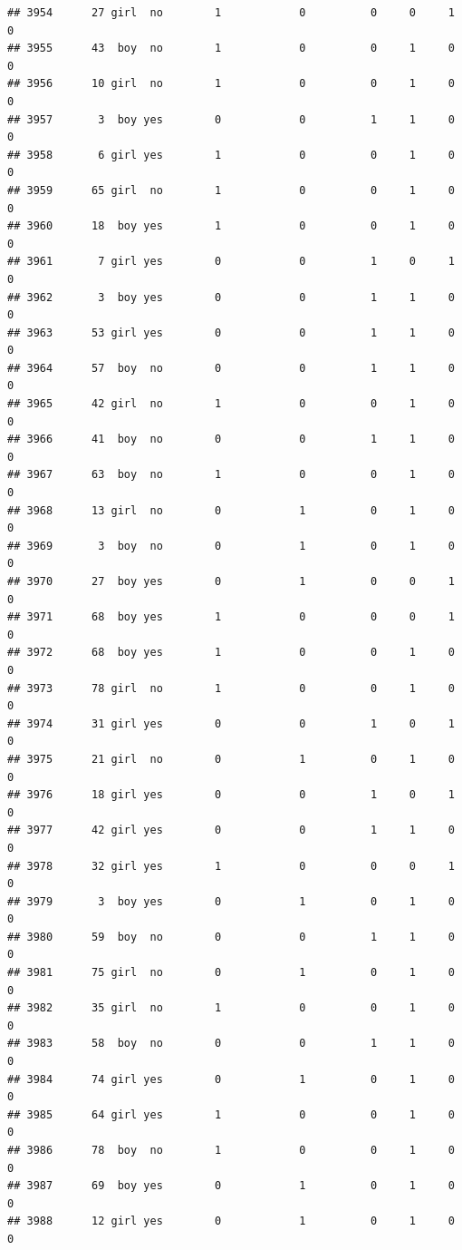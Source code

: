 \documentclass[man]{apa6}
\begin{document}
\begin{verbatim}
## 3954      27 girl  no        1            0          0     0     1     0
## 3955      43  boy  no        1            0          0     1     0     0
## 3956      10 girl  no        1            0          0     1     0     0
## 3957       3  boy yes        0            0          1     1     0     0
## 3958       6 girl yes        1            0          0     1     0     0
## 3959      65 girl  no        1            0          0     1     0     0
## 3960      18  boy yes        1            0          0     1     0     0
## 3961       7 girl yes        0            0          1     0     1     0
## 3962       3  boy yes        0            0          1     1     0     0
## 3963      53 girl yes        0            0          1     1     0     0
## 3964      57  boy  no        0            0          1     1     0     0
## 3965      42 girl  no        1            0          0     1     0     0
## 3966      41  boy  no        0            0          1     1     0     0
## 3967      63  boy  no        1            0          0     1     0     0
## 3968      13 girl  no        0            1          0     1     0     0
## 3969       3  boy  no        0            1          0     1     0     0
## 3970      27  boy yes        0            1          0     0     1     0
## 3971      68  boy yes        1            0          0     0     1     0
## 3972      68  boy yes        1            0          0     1     0     0
## 3973      78 girl  no        1            0          0     1     0     0
## 3974      31 girl yes        0            0          1     0     1     0
## 3975      21 girl  no        0            1          0     1     0     0
## 3976      18 girl yes        0            0          1     0     1     0
## 3977      42 girl yes        0            0          1     1     0     0
## 3978      32 girl yes        1            0          0     0     1     0
## 3979       3  boy yes        0            1          0     1     0     0
## 3980      59  boy  no        0            0          1     1     0     0
## 3981      75 girl  no        0            1          0     1     0     0
## 3982      35 girl  no        1            0          0     1     0     0
## 3983      58  boy  no        0            0          1     1     0     0
## 3984      74 girl yes        0            1          0     1     0     0
## 3985      64 girl yes        1            0          0     1     0     0
## 3986      78  boy  no        1            0          0     1     0     0
## 3987      69  boy yes        0            1          0     1     0     0
## 3988      12 girl yes        0            1          0     1     0     0

\end{verbatim}
\end{document}
